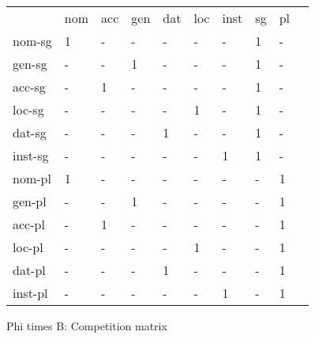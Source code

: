 \documentclass{article}
\begin{document}
\begin{tabular}{llllllllll}\toprule
                &nom     &acc     &gen     &dat     &loc     &inst    &sg      &pl      \\ 
nom-sg     &     1  &    -   &    -   &    -   &    -   &    -   &     1  &    -   \\ 
gen-sg     &    -   &    -   &     1  &    -   &    -   &    -   &     1  &    -   \\ 
acc-sg     &    -   &     1  &    -   &    -   &    -   &    -   &     1  &    -   \\ 
loc-sg     &    -   &    -   &    -   &    -   &     1  &    -   &     1  &    -   \\ 
dat-sg     &    -   &    -   &    -   &     1  &    -   &    -   &     1  &    -   \\ 
inst-sg    &    -   &    -   &    -   &    -   &    -   &     1  &     1  &    -   \\ 
nom-pl     &     1  &    -   &    -   &    -   &    -   &    -   &    -   &     1  \\ 
gen-pl     &    -   &    -   &     1  &    -   &    -   &    -   &    -   &     1  \\ 
acc-pl     &    -   &     1  &    -   &    -   &    -   &    -   &    -   &     1  \\ 
loc-pl     &    -   &    -   &    -   &    -   &     1  &    -   &    -   &     1  \\ 
dat-pl     &    -   &    -   &    -   &     1  &    -   &    -   &    -   &     1  \\ 
inst-pl    &    -   &    -   &    -   &    -   &    -   &     1  &    -   &     1  \\ 
\end{tabular}

 \vspace{0.2in}
 


Phi times B: Competition matrix 
\end{document}
